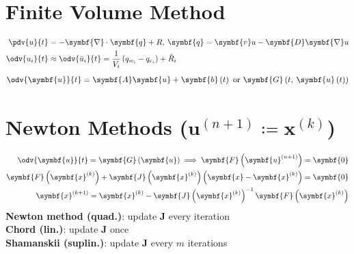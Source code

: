 \documentclass{article}
\begin{document}
\hfill%
\begin{minipage}[t]{62.39259259mm}
    \section{Finite Volume Method}
    \begin{align*}
        \pdv{u}{t}   & = - \symbf{\nabla} \cdot \symbf{q} + R,\: \symbf{q} = \symbf{v} u - \symbf{D} \symbf{\nabla} u \\
        \odv{u_i}{t} & \approx \odv{\bar{u}_i}{t} = \frac{1}{V_i} \left( q_{w_i} - q_{e_i} \right) + \bar{R}_i
    \end{align*}
    \begin{equation*}
        \odv{\symbf{u}}{t} = \symbf{A} \symbf{u} + \symbf{b}\left( t \right) \text{ or } \symbf{G}\left( t,\: \symbf{u}\left( t \right) \right)
    \end{equation*}
    \section{Newton Methods (\texorpdfstring{\(\symbf{u}^{\left( n+1 \right)} \coloneq \symbf{x}^{\left( k \right)}\)}{u(n+1) = x(k)})}
    \begin{align*}
        \odv{\symbf{u}}{t} = \symbf{G}\left( \symbf{u} \right) \implies \symbf{F}\left( \symbf{u}^{\left( n+1 \right)} \right) = \symbf{0}                                              & \\
        \symbf{F}\left( \symbf{x}^{\left( k \right)} \right) + \symbf{J}\left( \symbf{x}^{\left( k \right)} \right) \left( \symbf{x} - \symbf{x}^{\left( k \right)} \right) = \symbf{0} & \\
        \symbf{x}^{\left( k+1 \right)} = \symbf{x}^{\left( k \right)} - \symbf{J}\left( \symbf{x}^{\left( k \right)} \right)^{-1} \symbf{F}\left( \symbf{x}^{\left( k \right)} \right)  &
    \end{align*}
    \textbf{Newton method (quad.)}: update \(\symbf{J}\) every iteration \\
    \textbf{Chord (lin.)}: update \(\symbf{J}\) once \\
    \textbf{Shamanskii (suplin.)}: update \(\symbf{J}\) every \(m\) iterations

\end{minipage}
\end{document}
